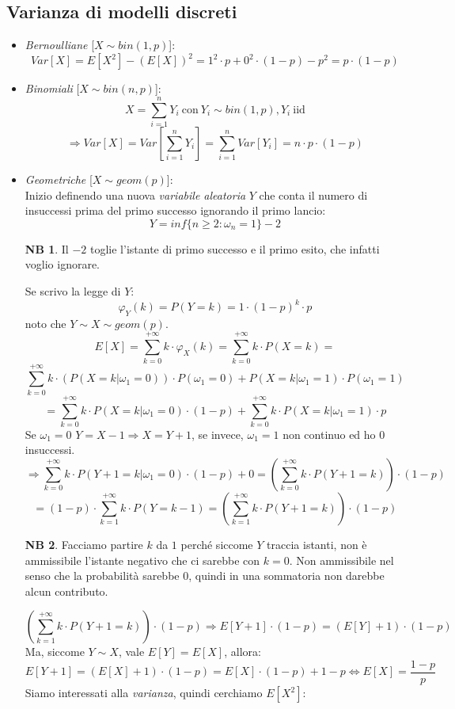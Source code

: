 \documentclass[12pt, a4paper]{report}
\theoremstyle{definition}
\newtheorem*{note}{NB}
\begin{document}
\subsection{Varianza di modelli discreti}
\begin{itemize}
	\item \emph{Bernoulliane} [$X\sim bin(1,p)$]:
	\[Var[X]=E[X^2]-(E[X])^2=1^2\cdot p+0^2\cdot (1-p)-p^2=p\cdot (1-p)\]
	\item \emph{Binomiali} [$X\sim bin(n,p)$]:
	\[X=\sum_{i=1}^nY_i\ \text{con}\ Y_i\sim bin(1,p),Y_i\ \text{iid}\]
	\[\Rightarrow Var[X]=Var\left[\sum_{i=1}^nY_i\right]=\sum_{i=1}^nVar[Y_i]=n\cdot p\cdot (1-p)\]
	\item \emph{Geometriche} [$X\sim geom(p)$]:\\
	Inizio definendo una nuova \emph{variabile aleatoria} $Y$ che conta il numero
	di insuccessi prima del primo successo ignorando il primo lancio:
	\[Y=inf\{n\geq 2:\omega_n=1\}-2\]
	\begin{note}
		Il $-2$ toglie l'istante di primo successo e il primo esito, che infatti
		voglio ignorare.
	\end{note}
	Se scrivo la legge di $Y$:
	\[\varphi_Y(k)=P(Y=k)=1\cdot (1-p)^k\cdot p\]
	noto che $Y\sim X\sim geom(p)$.
	\[E[X]=\sum_{k=0}^{+\infty}k\cdot \varphi_X(k)=\sum_{k=0}^{+\infty}k\cdot P(X=k)=\]
	\[\sum_{k=0}^{+\infty}k\cdot (P(X=k|\omega_1=0))\cdot P(\omega_1=0)+P(X=k|\omega_1=1)\cdot 
	P(\omega_1=1)\]
	\[=\sum_{k=0}^{+\infty}k\cdot P(X=k|\omega_1=0)\cdot (1-p)+\sum_{k=0}^{+\infty}k\cdot P(X=k
	|\omega_1=1)\cdot p\]
	Se $\omega_1=0$ \(Y=X-1\Rightarrow X=Y+1\), se invece, $\omega_1=1$ non
	continuo ed ho 0 insuccessi.
	\[\Rightarrow\sum_{k=0}^{+\infty}k\cdot P(Y+1=k|\omega_1=0)\cdot (1-p)+0=\left(\sum_{k=0}
	^{+\infty}k\cdot P(Y+1=k)\right)\cdot (1-p)\]
	\[=(1-p)\cdot \sum_{k=1}^{+\infty}k\cdot P(Y=k-1)=\left(\sum_{k=1}^{+\infty}k\cdot P(Y+1=k)
	\right)\cdot (1-p)\]
	\begin{note}
		Facciamo partire $k$ da $1$ perché siccome $Y$ traccia istanti, non è
		ammissibile l'istante negativo che ci sarebbe con $k=0$. Non ammissibile
		nel senso che la probabilità sarebbe $0$, quindi in una sommatoria non
		darebbe alcun contributo.
	\end{note}
	\[\left(\sum_{k=1}^{+\infty}k\cdot P(Y+1=k)\right)\cdot (1-p)\Rightarrow E[Y+1]\cdot (1-p)=
	(E[Y]+1)\cdot (1-p)\]
	Ma, siccome $Y\sim X$, vale \(E[Y]=E[X]\), allora:
	\[E[Y+1]=(E[X]+1)\cdot (1-p)=E[X]\cdot (1-p)+1-p\Leftrightarrow E[X]=\frac{1-p}{p}\]
	Siamo interessati alla \emph{varianza}, quindi cerchiamo $E[X^2]$:

\end{itemize}
\end{document}
